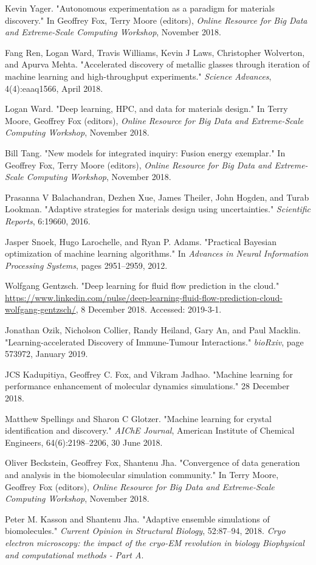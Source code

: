\documentclass[conference]{IEEEtran}
\begin{document}
\begin{thebibliography}{00}
 Kevin Yager. "Autonomous experimentation as a paradigm for materials discovery." In Geoffrey Fox, Terry Moore (editors), \textit{Online Resource for Big Data and Extreme-Scale Computing Workshop}, November 2018.

 Fang Ren, Logan Ward, Travis Williams, Kevin J Laws, Christopher Wolverton, and Apurva Mehta. "Accelerated discovery of metallic glasses through iteration of machine learning and high-throughput experiments." \textit{Science Advances}, 4(4):eaaq1566, April 2018.

 Logan Ward. "Deep learning, HPC, and data for materials design." In Terry Moore, Geoffrey Fox (editors), \textit{Online Resource for Big Data and Extreme-Scale Computing Workshop}, November 2018.

 Bill Tang. "New models for integrated inquiry: Fusion energy exemplar." In Geoffrey Fox, Terry Moore (editors), \textit{Online Resource for Big Data and Extreme-Scale Computing Workshop}, November 2018.

 Prasanna V Balachandran, Dezhen Xue, James Theiler, John Hogden, and Turab Lookman. "Adaptive strategies for materials design using uncertainties." \textit{Scientific Reports}, 6:19660, 2016.

 Jasper Snoek, Hugo Larochelle, and Ryan P. Adams. "Practical Bayesian optimization of machine learning algorithms." In \textit{Advances in Neural Information Processing Systems}, pages 2951–2959, 2012.

 Wolfgang Gentzsch. "Deep learning for fluid flow prediction in the cloud." \url{https://www.linkedin.com/pulse/deep-learning-fluid-flow-prediction-cloud-wolfgang-gentzsch/}, 8 December 2018. Accessed: 2019-3-1.

 Jonathan Ozik, Nicholson Collier, Randy Heiland, Gary An, and Paul Macklin. "Learning-accelerated Discovery of Immune-Tumour Interactions." \textit{bioRxiv}, page 573972, January 2019.

 JCS Kadupitiya, Geoffrey C. Fox, and Vikram Jadhao. "Machine learning for performance enhancement of molecular dynamics simulations." 28 December 2018.

 Matthew Spellings and Sharon C Glotzer. "Machine learning for crystal identification and discovery." \textit{AIChE Journal}, American Institute of Chemical Engineers, 64(6):2198–2206, 30 June 2018.

 Oliver Beckstein, Geoffrey Fox, Shantenu Jha. "Convergence of data generation and analysis in the biomolecular simulation community." In Terry Moore, Geoffrey Fox (editors), \textit{Online Resource for Big Data and Extreme-Scale Computing Workshop}, November 2018.

 Peter M. Kasson and Shantenu Jha. "Adaptive ensemble simulations of biomolecules." \textit{Current Opinion in Structural Biology}, 52:87–94, 2018. \textit{Cryo electron microscopy: the impact of the cryo-EM revolution in biology Biophysical and computational methods - Part A}.

\end{thebibliography}
\end{document}
